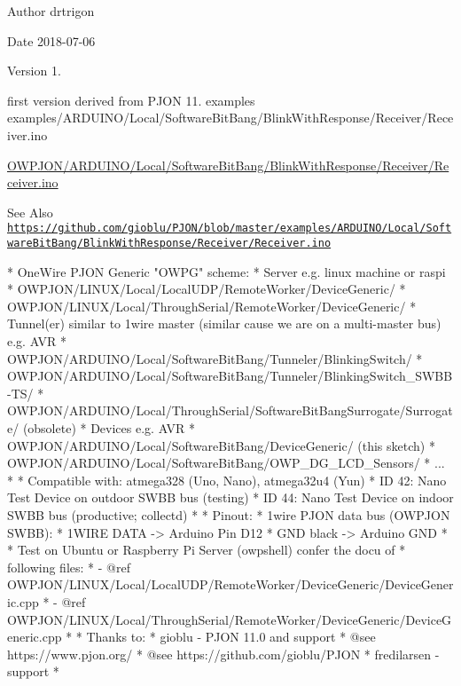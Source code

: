 \begin{DoxyAuthor}{Author}
drtrigon 
\end{DoxyAuthor}
\begin{DoxyDate}{Date}
2018-\/07-\/06 
\end{DoxyDate}
\begin{DoxyVersion}{Version}
1. \begin{DoxyItemize}
\item first version derived from P\-J\-O\-N 11. examples examples/\-A\-R\-D\-U\-I\-N\-O/\-Local/\-Software\-Bit\-Bang/\-Blink\-With\-Response/\-Receiver/\-Receiver.\-ino\end{DoxyItemize}
\hyperlink{SoftwareBitBang_2BlinkWithResponse_2Receiver_2Receiver_8ino}{O\-W\-P\-J\-O\-N/\-A\-R\-D\-U\-I\-N\-O/\-Local/\-Software\-Bit\-Bang/\-Blink\-With\-Response/\-Receiver/\-Receiver.\-ino} 
\end{DoxyVersion}
\begin{DoxySeeAlso}{See Also}
\href{https://github.com/gioblu/PJON/blob/master/examples/ARDUINO/Local/SoftwareBitBang/BlinkWithResponse/Receiver/Receiver.ino}{\tt https\-://github.\-com/gioblu/\-P\-J\-O\-N/blob/master/examples/\-A\-R\-D\-U\-I\-N\-O/\-Local/\-Software\-Bit\-Bang/\-Blink\-With\-Response/\-Receiver/\-Receiver.\-ino}
\end{DoxySeeAlso}
\begin{DoxyVerb}* OneWire PJON Generic "OWPG" scheme:
*   Server e.g. linux machine or raspi
*      OWPJON/LINUX/Local/LocalUDP/RemoteWorker/DeviceGeneric/
*      OWPJON/LINUX/Local/ThroughSerial/RemoteWorker/DeviceGeneric/
*   Tunnel(er) similar to 1wire master (similar cause we are on a multi-master bus) e.g. AVR
*      OWPJON/ARDUINO/Local/SoftwareBitBang/Tunneler/BlinkingSwitch/
*      OWPJON/ARDUINO/Local/SoftwareBitBang/Tunneler/BlinkingSwitch_SWBB-TS/
*      OWPJON/ARDUINO/Local/ThroughSerial/SoftwareBitBangSurrogate/Surrogate/ (obsolete)
*   Devices e.g. AVR
*      OWPJON/ARDUINO/Local/SoftwareBitBang/DeviceGeneric/ (this sketch)
*      OWPJON/ARDUINO/Local/SoftwareBitBang/OWP_DG_LCD_Sensors/
*      ...
*
* Compatible with: atmega328 (Uno, Nano), atmega32u4 (Yun)
*   ID 42: Nano Test Device on outdoor SWBB bus (testing)
*   ID 44: Nano Test Device on indoor SWBB bus (productive; collectd)
*
* Pinout:
*   1wire PJON data bus (OWPJON SWBB):
*        1WIRE DATA    -> Arduino Pin D12
*        GND black     -> Arduino GND
*
* Test on Ubuntu or Raspberry Pi Server (owpshell) confer the docu of
* following files:
*   - @ref OWPJON/LINUX/Local/LocalUDP/RemoteWorker/DeviceGeneric/DeviceGeneric.cpp
*   - @ref OWPJON/LINUX/Local/ThroughSerial/RemoteWorker/DeviceGeneric/DeviceGeneric.cpp
*
* Thanks to:
* gioblu - PJON 11.0 and support
*          @see https://www.pjon.org/
*          @see https://github.com/gioblu/PJON
* fredilarsen - support
* \end{DoxyVerb}


